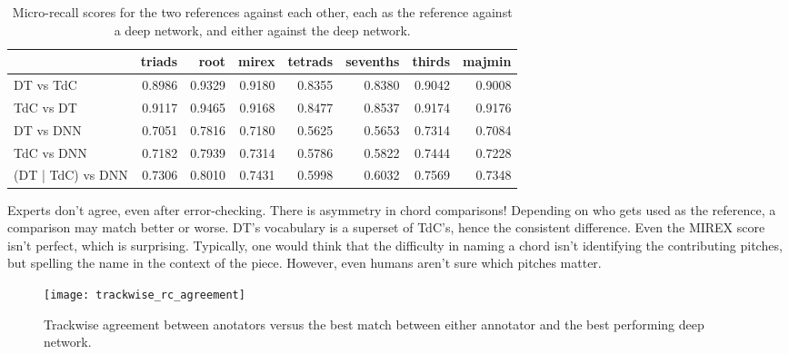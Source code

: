 %



\begin{table}[h]
\begin{center}
\scriptsize
\caption{Micro-recall scores for the two references against each other, each as the reference against a deep network, and either against the deep network.}
\label{tab:rc_}

\begin{tabular}{lrrrrrrr}
\hline
         &   triads &   root &   mirex &   tetrads &   sevenths &   thirds &   majmin \\
\hline
DT vs TdC  &  0.8986 & 0.9329 &  0.9180  &   0.8355  &    0.8380  &   0.9042  &  0.9008 \\
TdC vs DT &   0.9117 & 0.9465 &  0.9168  &   0.8477  &    0.8537 &   0.9174 &    0.9176 \\
\hline
DT vs DNN  &   0.7051 & 0.7816 &  0.7180  &   0.5625   &   0.5653  &  0.7314  &  0.7084 \\
TdC vs DNN  & 0.7182 & 0.7939 & 0.7314  &   0.5786  &    0.5822 &   0.7444 &   0.7228 \\
\hline
(DT | TdC) vs DNN & 0.7306 & 0.8010 & 0.7431  &   0.5998  &    0.6032 &   0.7569  &  0.7348\\
\hline
\end{tabular}
\end{center}
\end{table}

Experts don't agree, even after error-checking.
There is asymmetry in chord comparisons!
Depending on who gets used as the reference, a comparison may match better or worse.
DT's vocabulary is a superset of TdC's, hence the consistent difference.
Even the MIREX score isn't perfect, which is surprising.
Typically, one would think that the difficulty in naming a chord isn't identifying the contributing pitches, but spelling the name in the context of the piece.
However, even humans aren't sure which pitches matter.


\begin{figure}[t]
\centering
\texttt{[image: trackwise\_rc\_agreement]}
\caption{Trackwise agreement between anotators versus the best match between either annotator and the best performing deep network.}
\label{fig:trackwise_test_agreement}
\end{figure}


